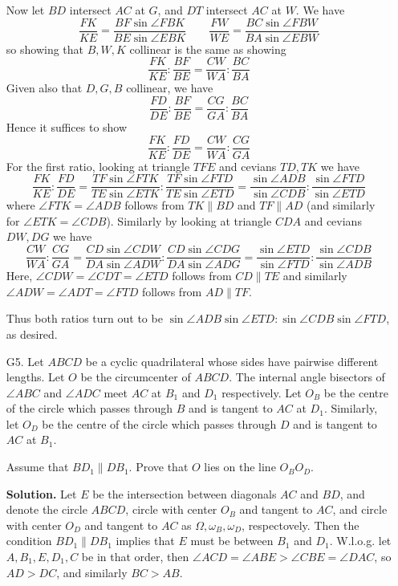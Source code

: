 \documentclass[11pt,a4paper]{article}
\begin{document}
\begin{enumerate}
		Now let $BD$ intersect $AC$ at $G$, and $DT$ intersect $AC$ at $W$. 
		We have 
		\[
		\frac{FK}{KE}
		=\frac{BF\sin\angle FBK}{BE\sin\angle EBK}
		\qquad 
		\frac{FW}{WE}
		=\frac{BC\sin\angle FBW}{BA\sin\angle EBW}
		\]
		so showing that $B, W, K$ collinear is the same as showing 
		\[
		\frac{FK}{KE}:\frac{BF}{BE}=\frac{CW}{WA}:\frac{BC}{BA}
		\]
		Given also that $D, G, B$ collinear, we have 
		\[
		\frac{FD}{DE}:\frac{BF}{BE}=\frac{CG}{GA}:\frac{BC}{BA}
		\]
		Hence it suffices to show 
		\[
		\frac{FK}{KE}:\frac{FD}{DE}=\frac{CW}{WA}:\frac{CG}{GA}
		\]
		For the first ratio, looking at triangle $TFE$ and cevians $TD, TK$ we have 
		\[
		\frac{FK}{KE}:\frac{FD}{DE}
		=\frac{TF\sin\angle FTK}{TE\sin\angle ETK}:\frac{TF\sin\angle FTD}{TE\sin\angle ETD}
		=\frac{\sin\angle ADB}{\sin\angle CDB}:\frac{\sin\angle FTD}{\sin\angle ETD}
		\]
		where $\angle FTK=\angle ADB$ follows from $TK\parallel BD$ and $TF\parallel AD$ (and similarly for $\angle ETK=\angle CDB$). 
		Similarly by looking at triangle $CDA$ and cevians $DW, DG$ we have 
		\[
		\frac{CW}{WA}:\frac{CG}{GA}
		=\frac{CD\sin\angle CDW}{DA\sin\angle ADW}:\frac{CD\sin\angle CDG}{DA\sin\angle ADG}
		=\frac{\sin\angle ETD}{\sin\angle FTD}:\frac{\sin\angle CDB}{\sin\angle ADB}
		\]
		Here, $\angle CDW=\angle CDT=\angle ETD$ follows from $CD\parallel TE$ and similarly $\angle ADW=\angle ADT=\angle FTD$ follows from $AD\parallel TF$. 
		
		Thus both ratios turn out to be $\sin\angle ADB\sin\angle ETD: \sin\angle CDB\sin\angle FTD$, 
		as desired. 
		\item [G5.]
		Let $ABCD$ be a cyclic quadrilateral whose sides have pairwise different lengths. 
		Let $O$ be the circumcenter of $ABCD$. 
		The internal angle bisectors of $\angle ABC$ and $\angle ADC$ meet $AC$ at $B_1$ and $D_1$ respectively. 
		Let $O_B$ be the centre of the circle which passes through $B$ and is tangent to $AC$ at $D_1$. 
		Similarly, let $O_D$ be the centre of the circle which passes through $D$ and is tangent to $AC$ at $B_1$.
		
		Assume that $BD_1 \parallel DB_1$. Prove that $O$ lies on the line $O_BO_D$.
		
		\textbf{Solution.} 
		Let $E$ be the intersection between diagonals $AC$ and $BD$, and denote the circle $ABCD$, 
		circle with center $O_B$ and tangent to $AC$, 
		and circle with center $O_D$ and tangent to $AC$ as $\Omega, \omega_B, \omega_D$, respectovely. 
		Then the condition $BD_1 \parallel DB_1$ implies that $E$ must be between $B_1$ and $D_1$. 
		W.l.o.g. let $A, B_1, E, D_1, C$ be in that order, 
		then $\angle ACD=\angle ABE>\angle CBE=\angle DAC$, 
		so $AD>DC$, and similarly $BC>AB$. 
		

\end{enumerate}
\end{document}
